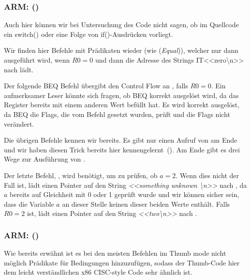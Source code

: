 \subsubsection{ARM: \OptimizingKeilVI (\ARMMode)}


Auch hier können wir bei Untersuchung des Code nicht sagen, ob im Quellcode ein switch() oder eine Folge von
if()-Ausdrücken vorliegt.


Wir finden hier Befehle mit Prädikaten wieder (wie \ADREQ (\emph{Equal})), welcher nur dann ausgeführt wird, wenn $R0=0$
und dann die Adresse des Strings IT{<<zero\textbackslash{}n>>} nach  lädt.

Der folgende \ac{BEQ} Befehl übergibt den Control Flow an , falls $R0=0$.
Ein aufmerksamer Leser könnte sich fragen, ob \ac{BEQ} korrekt ausgelöst wird, da \ADREQ das  Register bereits
mit einem anderen Wert befüllt hat.
Es wird korrekt ausgelöst, da \ac{BEQ} die Flags, die vom \CMP Befehl gesetzt wurden, prüft und \ADREQ die Flags nicht
verändert.

Die übrigen Befehle kennen wir bereits.
Es gibt nur einen Aufruf von \printf am Ende und wir haben diesen Trick bereits hier
kennengelernt~(). Am Ende gibt es drei Wege zur Ausführung von \printf.

Der letzte Befehl, , wird benötigt, um zu prüfen, ob $a=2$.
Wenn dies nicht der Fall ist, lädt \ADRNE einen Pointer auf den String \emph{<<something unknown \textbackslash{}n>>} nach
, da $a$ bereits auf Gleichheit mit 0 oder 1 geprüft wurde und wir können sicher sein, dass die Variable $a$ an
dieser Stelle keinen dieser beiden Werte enthält.
Falls $R0=2$ ist, lädt \ADREQ einen Pointer auf den String \emph{<<two\textbackslash{}n>>} nach . 

\subsubsection{ARM: \OptimizingKeilVI (\ThumbMode)}



Wie bereits erwähnt ist es bei den meisten Befehlen im Thumb mode nicht möglich Prädikate für Bedingungen hinzuzufügen,
sodass der Thumb-Code hier dem leicht verständlichen x86 \ac{CISC}-style Code sehr ähnlich ist.

